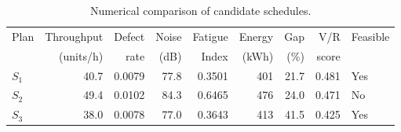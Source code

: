 \begin{table}[htbp]
\centering
\caption{Numerical comparison of candidate schedules.}
\label{tab:numerical-sim}
\small
\begin{tabular}{@{}lrrrrrrrl@{}}
\toprule
Plan & Throughput & Defect & Noise & Fatigue & Energy & Gap & V/R & Feasible \\
     & (units/h)  & rate   & (dB)  & Index   & (kWh)  & (\%) & score &         \\
\midrule
$S_{1}$ & 40.7 & 0.0079 & 77.8 & 0.3501 & 401 & 21.7 & 0.481 & Yes \\
$S_{2}$ & 49.4 & 0.0102 & 84.3 & 0.6465 & 476 & 24.0 & 0.471 & No \\
$S_{3}$ & 38.0 & 0.0078 & 77.0 & 0.3643 & 413 & 41.5 & 0.425 & Yes \\
\bottomrule
\end{tabular}
\end{table}
